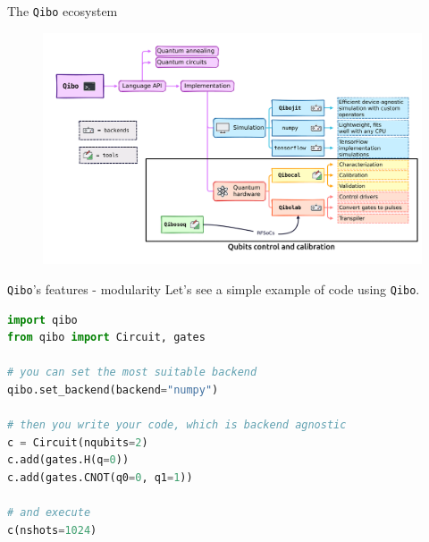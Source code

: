 \documentclass[8pt, xcolor={svgnames}, hyperref={linkcolor=black}]{beamer}
\begin{document}
\begin{frame}{The \texttt{Qibo} ecosystem}
\begin{figure}  
   \includegraphics[width=1\textwidth]{figures/eco3.png}
\end{figure}
\end{frame}

\begin{frame}[fragile]{\texttt{Qibo}'s features - modularity}
Let's see a simple example of code using \texttt{Qibo}.
\pause
\begin{tcolorbox}
\large
\begin{lstlisting}[language=Python]
import qibo
from qibo import Circuit, gates

# you can set the most suitable backend
qibo.set_backend(backend="numpy")

# then you write your code, which is backend agnostic
c = Circuit(nqubits=2)
c.add(gates.H(q=0))
c.add(gates.CNOT(q0=0, q1=1))

# and execute
c(nshots=1024)
\end{lstlisting}
\end{tcolorbox}
\end{frame}
\end{document}
